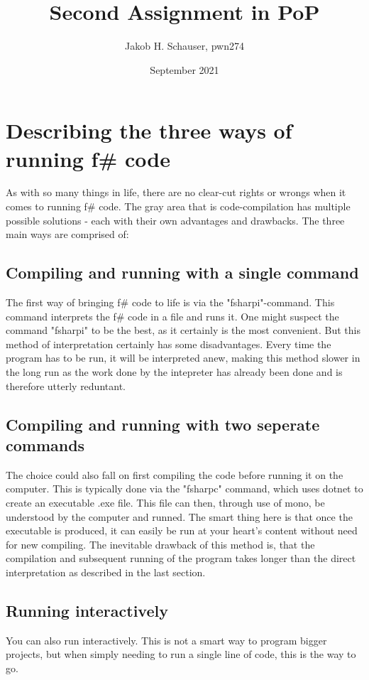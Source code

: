 \documentclass{article}
\title{Second Assignment in PoP}
\author{Jakob H. Schauser, pwn274}
\date{September 2021}
\begin{document}
\maketitle
\newpage
\tableofcontents
\newpage
\section{Describing the three ways of running f\# code}
As with so many things in life, there are no clear-cut rights or wrongs when it comes to running f\# code. The gray area that is code-compilation has multiple possible solutions
 - each with their own advantages and drawbacks. The three main ways are comprised of:
\subsection{Compiling and running with a single command}
The first way of bringing f\# code to life is via the "fsharpi"-command. This command interprets the f\# code in a file and runs it.
One might suspect the command "fsharpi" to be the best, as it certainly is the most convenient. But this method of interpretation certainly has some disadvantages. 
Every time the program has to be run, it will be interpreted anew, making this method slower in the long run as the work done by the intepreter has already been done and is 
therefore utterly reduntant.
\subsection{Compiling and running with two seperate commands}
The choice could also fall on first compiling the code before running it on the computer. This is typically done via the "fsharpc" command, which uses dotnet to create an 
executable .exe file. This file can then, through use of mono, be understood by the computer and runned. The smart thing here is that once the executable is produced, it can
easily be run at your heart's content without need for new compiling. The inevitable drawback of this method is, that the compilation and subsequent running of the program
takes longer than the direct interpretation as described in the last section.
\subsection{Running interactively}
You can also run interactively. This is not a smart way to program bigger projects, but when simply needing to run a single line of code, this is the way to go. 
\end{document}
